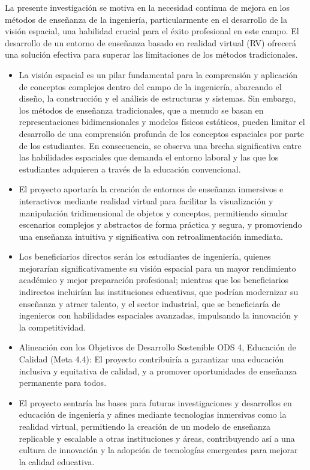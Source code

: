 La presente investigación se motiva en la necesidad continua de mejora en los métodos de enseñanza de la ingeniería, particularmente en el desarrollo de la visión espacial, una habilidad crucial para el éxito profesional en este campo. El desarrollo de un entorno de enseñanza basado en realidad virtual (RV) ofrecerá una solución efectiva para superar las limitaciones de los métodos tradicionales.

\begin{itemize}
  \item La visión espacial es un pilar fundamental para la comprensión y aplicación de conceptos complejos dentro del campo de la ingeniería, abarcando el diseño, la construcción y el análisis de estructuras y sistemas. Sin embargo, los métodos de enseñanza tradicionales, que a menudo se basan en representaciones bidimensionales y modelos físicos estáticos, pueden limitar el desarrollo de una comprensión profunda de los conceptos espaciales por parte de los estudiantes. En consecuencia, se observa una brecha significativa entre las habilidades espaciales que demanda el entorno laboral y las que los estudiantes adquieren a través de la educación convencional.
  \item El proyecto aportaría la creación de entornos de enseñanza inmersivos e interactivos mediante realidad virtual para facilitar la visualización y manipulación tridimensional de objetos y conceptos, permitiendo simular escenarios complejos y abstractos de forma práctica y segura, y promoviendo una enseñanza intuitiva y significativa con retroalimentación inmediata.
  \item Los beneficiarios directos serán los estudiantes de ingeniería, quienes mejorarían significativamente su visión espacial para un mayor rendimiento académico y mejor preparación profesional; mientras que los beneficiarios indirectos incluirían las instituciones educativas, que podrían modernizar su enseñanza y atraer talento, y el sector industrial, que se beneficiaría de ingenieros con habilidades espaciales avanzadas, impulsando la innovación y la competitividad.
  \item Alineación con los Objetivos de Desarrollo Sostenible ODS 4, Educación de Calidad (Meta 4.4): El proyecto contribuiría a garantizar una educación inclusiva y equitativa de calidad, y a promover oportunidades de enseñanza permanente para todos.
  \item El proyecto sentaría las bases para futuras investigaciones y desarrollos en educación de ingeniería y afines mediante tecnologías inmersivas como la realidad virtual, permitiendo la creación de un modelo de enseñanza replicable y escalable a otras instituciones y áreas, contribuyendo así a una cultura de innovación y la adopción de tecnologías emergentes para mejorar la calidad educativa.
\end{itemize}

